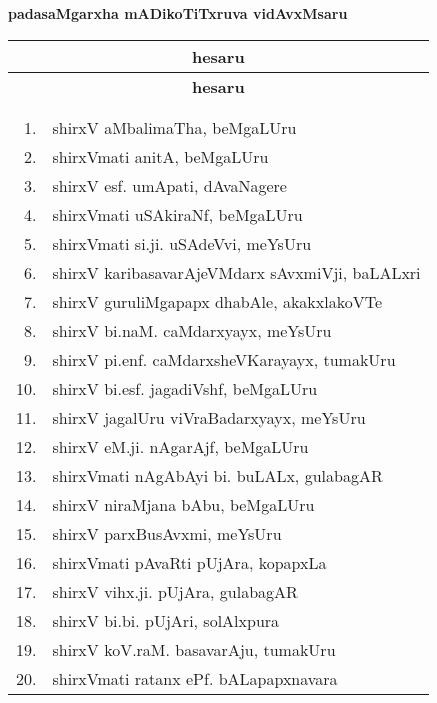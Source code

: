 \begin{center}
{\large\bf padasaMgarxha mADikoTiTxruva vidAvxMsaru}

\thispagestyle{empty}

\lhead[]{}
\rhead[]{}

\begin{minipage}[t]{7cm}
{\renewcommand{\arraystretch}{1.5}
\begin{longtable}{rl}
\hline
\multicolumn{2}{c}{\bf hesaru}\\[3pt]
\hline
\endfirsthead
\hline
\multicolumn{2}{c}{\bf hesaru}\\[3pt]
\hline
  & \\[-10pt]
\endhead
\endfoot
\endlastfoot
  & \\[-15pt]
1. & shirxV aMbalimaTha, beMgaLUru\\
2. & shirxVmati anitA, beMgaLUru\\
3. & shirxV esf. umApati, dAvaNagere\\
4. & shirxVmati uSAkiraNf, beMgaLUru\\
5. & shirxVmati si.ji. uSAdeVvi, meYsUru\\
6. & shirxV karibasavarAjeVMdarx sAvxmiVji, baLALxri\\
7. & shirxV guruliMgapapx dhabAle, akakxlakoVTe\\
8. & shirxV bi.naM. caMdarxyayx, meYsUru\\
9. & shirxV pi.enf. caMdarxsheVKarayayx, tumakUru\\
10. & shirxV bi.esf. jagadiVshf, beMgaLUru\\
11. & shirxV jagalUru viVraBadarxyayx, meYsUru\\
12. & shirxV eM.ji. nAgarAjf, beMgaLUru\\
13. &  shirxVmati nAgAbAyi bi. buLALx, gulabagAR\\
14. & shirxV niraMjana bAbu, beMgaLUru\\
15. & shirxV parxBusAvxmi, meYsUru\\
16. & shirxVmati pAvaRti pUjAra, kopapxLa\\
17. & shirxV vihx.ji. pUjAra, gulabagAR\\
18. & shirxV bi.bi. pUjAri, solAlxpura\\
19. & shirxV koV.raM. basavarAju, tumakUru\\
20. & shirxVmati ratanx ePf. bALapapxnavara 
\end{longtable}}

\end{minipage}
\end{center}
